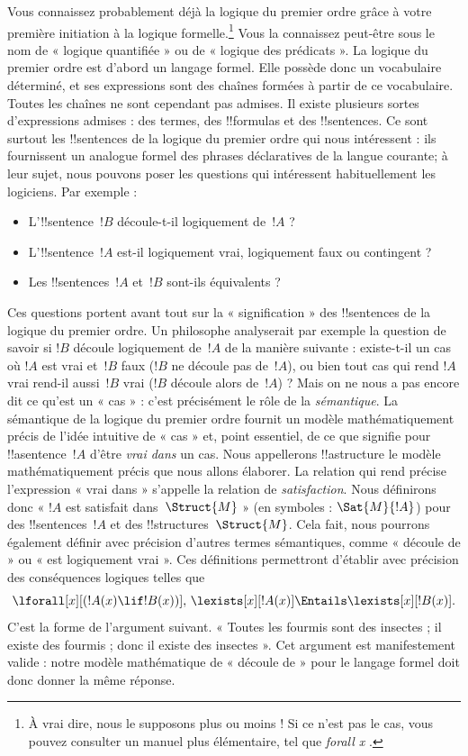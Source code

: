 \documentclass[../../../include/open-logic-section]{subfiles}
\begin{document}


Vous connaissez probablement déjà la logique du premier ordre grâce à
votre première initiation à la logique formelle.\footnote{À vrai dire,
nous le supposons plus ou moins !{} Si ce n'est pas le cas, vous pouvez
consulter un manuel plus élémentaire, tel que \emph{forall x}
\citep{Magnus2021}.} Vous la connaissez peut-être sous le nom de
« logique quantifiée » ou de « logique des prédicats ». La logique du
premier ordre est d'abord un langage formel. Elle possède donc un
vocabulaire déterminé, et ses expressions sont des chaînes formées à
partir de ce vocabulaire. Toutes les chaînes ne sont cependant pas
admises. Il existe plusieurs sortes d'expressions admises : des termes,
des !!{formula}s et des !!{sentence}s. Ce sont surtout les
!!{sentence}s de la logique du premier ordre qui nous intéressent : ils
fournissent un analogue formel des phrases déclaratives de la langue
courante; à leur sujet, nous pouvons poser les questions qui intéressent
habituellement les logiciens. Par exemple :
\begin{itemize}
    \item L'!!{sentence}~$!B$ découle-t-il logiquement de~$!A$ ?
    \item L'!!{sentence}~$!A$ est-il logiquement vrai, logiquement faux
      ou contingent ?
    \item Les !!{sentence}s~$!A$ et~$!B$ sont-ils équivalents ?
\end{itemize}

Ces questions portent avant tout sur la « signification » des
!!{sentence}s de la logique du premier ordre. Un philosophe analyserait
par exemple la question de savoir si $!B$ découle logiquement de~$!A$ de
la manière suivante : existe-t-il un cas où $!A$ est vrai et~$!B$ faux
($!B$ ne découle pas de~$!A$), ou bien tout cas qui rend $!A$ vrai
rend-il aussi~$!B$ vrai ($!B$ découle alors de~$!A$) ? Mais on ne nous a
pas encore dit ce qu'est un « cas » : c'est précisément le rôle de la
\emph{sémantique}. La sémantique de la logique du premier ordre fournit
un modèle mathématiquement précis de l'idée intuitive de « cas » et,
point essentiel, de ce que signifie pour !!a{sentence}~$!A$ d'être
\emph{vrai dans} un cas. Nous appellerons !!a{structure} le modèle
mathématiquement précis que nous allons élaborer. La relation qui rend
précise l'expression « vrai dans » s'appelle la relation de
\emph{satisfaction}. Nous définirons donc « $!A$ est satisfait
dans~$\Struct{M}$ » (en symboles : $\Sat{M}{!A}$) pour des
!!{sentence}s~$!A$ et des !!{structure}s~$\Struct{M}$. Cela fait, nous
pourrons également définir avec précision d'autres termes sémantiques,
comme « découle de » ou « est logiquement vrai ». Ces définitions
permettront d'établir avec précision des conséquences logiques telles que
\[
  \lforall[x][(!A(x) \lif !B(x))],\,
  \lexists[x][!A(x)] \Entails \lexists[x][!B(x)].
\]
C'est la forme de l'argument suivant.
« Toutes les fourmis sont des insectes ; il existe des fourmis ; donc
il existe des insectes ». Cet argument est manifestement valide : notre
modèle mathématique de « découle de » pour le langage formel doit donc
donner la même réponse.
\end{document}
